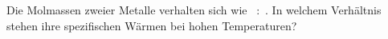 Die Molmassen zweier Metalle verhalten sich wie \MaO~:~\MbO. In welchem Verhältnis stehen ihre spezifischen Wärmen bei hohen Temperaturen?
